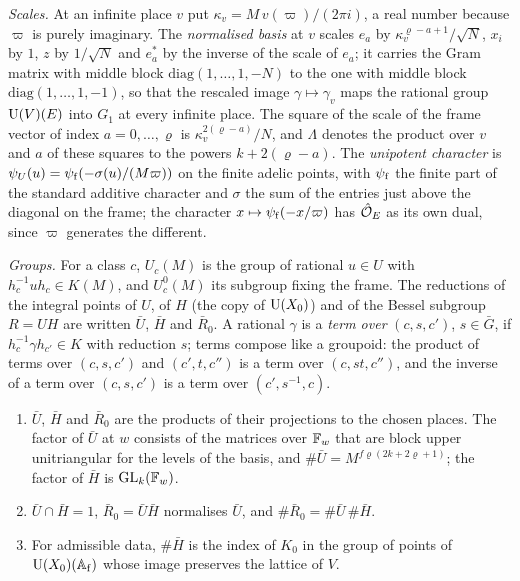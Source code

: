 \emph{Scales.} At an infinite place $v$ put $\kappa_v=M\,v(\varpi)/(2\pi i)$, a real number because $\varpi$ is purely imaginary. The \emph{normalised basis} at $v$ scales $e_a$ by $\kappa_v^{\varrho-a+1}/\sqrt N$, $x_i$ by $1$, $z$ by $1/\sqrt N$ and
$e^*_a$ by the inverse of the scale of $e_a$; it carries the Gram matrix with middle block $\mathrm{diag}(1,\dots,1,-N)$ to the one with middle block $\mathrm{diag}(1,\dots,1,-1)$, so that the rescaled image $\gamma\mapsto\gamma_v$ maps the rational
group $\operatorname{U}(V)(E)$ into $G_1$ at every infinite place. The square of the scale of the frame vector of index $a=0,\dots,\varrho$ is $\kappa_v^{2(\varrho-a)}/N$, and $\Lambda$ denotes the product over $v$ and $a$ of these squares to the
powers $k+2(\varrho-a)$. The \emph{unipotent character} is $\psi_U(u)=\psi_{\rm f}(-\sigma(u)/(M\varpi))$ on the finite adelic points, with $\psi_{\rm f}$ the finite part of the standard additive character and $\sigma$ the sum of the entries just above
the diagonal on the frame; the character $x\mapsto\psi_{\rm f}(-x/\varpi)$ has $\hat{\mathcal{O}}_E$ as its own dual, since $\varpi$ generates the different.

\emph{Groups.} For a class $c$, $U_c(M)$ is the group of rational $u\in U$ with $h_c^{-1}uh_c\in K(M)$, and $U^0_c(M)$ its subgroup fixing the frame. The reductions of the integral points of $U$, of $H$ (the copy of $\operatorname{U}(X_0)$) and of the Bessel
subgroup $R=UH$ are written $\bar U$, $\bar H$ and $\bar R_0$. A rational $\gamma$ is a \emph{term over} $(c,s,c')$, $s\in\bar G$, if $h_c^{-1}\gamma h_{c'}\in K$ with reduction $s$; terms compose like a groupoid: the product of terms over $(c,s,c')$ and $(c',t,c'')$ is a term over
$(c,st,c'')$, and the inverse of a term over $(c,s,c')$ is a term over $(c',s^{-1},c)$.

\begin{lemma}\label{lem:reduced-groups}
\begin{enumerate}[label=\textup{(\alph*)}]
\item $\bar U$, $\bar H$ and $\bar R_0$ are the products of their projections to the chosen places. The factor of $\bar U$ at $w$ consists of the matrices over $\mathbb{F}_w$ that are block upper unitriangular for the levels of the basis, and
$\#\bar U=M^{f\varrho(2k+2\varrho+1)}$; the factor of $\bar H$ is $\operatorname{GL}_k(\mathbb{F}_w)$.
\item $\bar U\cap\bar H=1$, $\bar R_0=\bar U\bar H$ normalises $\bar U$, and $\#\bar R_0=\#\bar U\,\#\bar H$.
\item For admissible data, $\#\bar H$ is the index of $K_0$ in the group of points of $\operatorname{U}(X_0)(\mathbb{A}_{\rm f})$ whose image preserves the lattice of $V$.
\end{enumerate}
\end{lemma}

